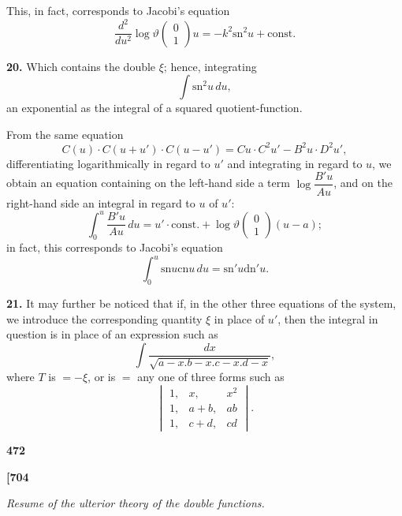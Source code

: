 \documentclass[11pt,a4paper]{book}
\providecommand{\sn}{\mathrm{sn}}
\providecommand{\cn}{\mathrm{cn}}
\providecommand{\dn}{\mathrm{dn}}
\begin{document}
This, in fact, corresponds to Jacobi's equation
\[
\frac{d^2}{du^2}\log \vartheta\begin{pmatrix} 0 \\ 1 \end{pmatrix}u = -k^2 \sn^2 u + \text{const.}
\]

\noindent\textbf{20.}\quad
Which contains the double $\xi$; hence, integrating
\[
\int \sn^2 u\, du,
\]
an exponential as the integral of a squared quotient-function.

From the same equation
\[
C(u) \cdot C(u + u') \cdot C(u - u') = Cu \cdot C^2 u' - B^2 u \cdot D^2 u',
\]
differentiating logarithmically in regard to $u'$ and integrating in regard to $u$, we obtain an equation containing on the left-hand side a term $\log \dfrac{B'u}{Au}$, and on the right-hand side an integral in regard to $u$ of $u'$:
\[
\int_0^u \frac{B'u}{Au}\, du = u' \cdot \text{const.} + \log \vartheta\begin{pmatrix} 0 \\ 1 \end{pmatrix}(u - a);
\]
in fact, this corresponds to Jacobi's equation
\[
\int_0^u \sn u \cn u \, du = \sn' u \dn' u.
\]

\noindent\textbf{21.}\quad
It may further be noticed that if, in the other three equations of the system, we introduce the corresponding quantity $\xi$ in place of $u'$, then the integral in question is in place of an expression such as
\[
\int \frac{dx}{\sqrt{a - x . b - x . c - x . d - x}},
\]
where $T$ is $= -\xi$, or is $= $ any one of three forms such as
\[
\begin{vmatrix}
1, & x, & x^2 \\
1, & a + b, & ab \\
1, & c + d, & cd
\end{vmatrix}.
\]

\vspace{1em}

\begin{center}
\textbf{472}
\end{center}

\vspace{0.5em}

\noindent\textbf{[704}

\vspace{0.5em}

\begin{center}
\textit{Resume of the ulterior theory of the double functions.}
\end{center}
\end{document}
